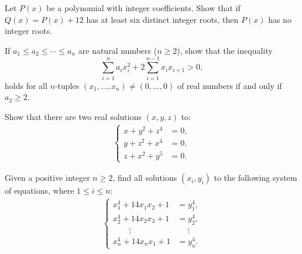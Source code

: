 \begin{question}[name={1988 Austrian--Polish}]
    Let $P(x)$ be a polynomial with integer coefficients. Show that if $Q(x) = P(x) +12$ has at least six distinct integer roots, then $P(x)$ has no integer roots.
\end{question}




\begin{question}[name={1988 Austrian--Polish}]
    If $a_1 \le  a_2 \le  \cdots \le  a_n$ are natural numbers ($n \ge 2$), show that the inequality $$\sum_{i=1}^n a_ix_i^2 +2\sum_{i=1}^{n-1} x_ix_{i+1}  >0,$$ holds for all $n$-tuples $(x_1,\dots,x_n) \ne (0,\dots, 0)$ of real numbers if and only if $a_2 \ge 2$.
\end{question}




\begin{question}[name={1990 Austrian--Polish}]
    Show that there are two real solutions $(x,y,z)$ to:
    \begin{align*}
        \begin{cases}
            x + y^2 + z^4 &= 0,\\
            y + z^2 + x^4 &= 0,\\
            z + x^2 + y^5 &= 0.
        \end{cases}
    \end{align*}
\end{question}



\begin{question}[name={1990 Austrian--Polish}]
    Given a positive integer $n\geq 2$, find all solutions $(x_i,y_i)$ to the following system of equations, where $1 \leq i \leq n$:
    \begin{align*}
        \begin{cases}
            x_1^4 + 14x_1x_2 + 1  &= y_1^4,\\
            x_2^4 + 14x_2x_3 + 1  &= y_2^4,\\
            \qquad \vdots &\phantom{=} \vdots\\
            x_n^4 + 14x_nx_1 + 1  &= y_n^4.
        \end{cases}
    \end{align*}
\end{question}



